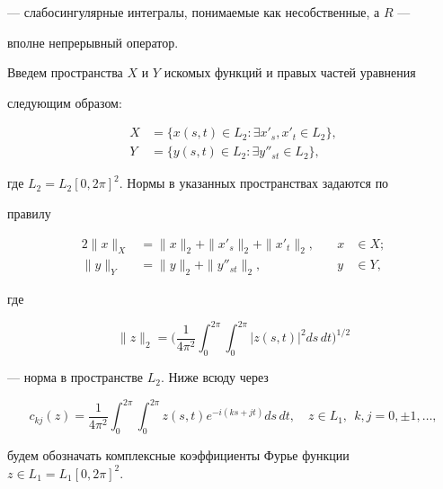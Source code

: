 --- слабосингулярные интегралы, понимаемые как несобственные, а $R$ --- 


вполне непрерывный оператор. 


 


Введем пространства $X$ и $Y$ искомых функций и правых частей уравнения  


следующим образом:  


\begin{align*} 


X&=\{x(s,t)\in L_2:\exists x'_s,x'_t\in L_2\},\\ 


Y&=\{y(s,t)\in L_2:\exists y''_{st}\in L_2\}, 


\end{align*} 


где $L_2=L_2[0,2\pi]^2$. Нормы в указанных пространствах задаются по 


правилу 


\begin{alignat*}{2} 


\|x\|_X&=\|x\|_2+\|x'_s\|_2+\|x'_t\|_2,&\quad x&\in X;\\ 


\|y\|_Y&=\|y\|_2+\|y''_{st}\|_2,&\quad y&\in Y, 


\end{alignat*} 


где 


$$ 


\|z\|_2=\bigg(\frac{1}{4\pi^2}\int^{2\pi}_0\int^{2\pi}_0 


|z(s,t)|^2ds\,dt\bigg)^{1/2} 


$$ 


--- норма в пространстве $L_2$. Ниже всюду через 


$$ 


c_{kj}(z)=\frac{1}{4\pi^2}\int^{2\pi}_0\int^{2\pi}_0 


z(s,t)e^{-i(ks+jt)}ds\,dt,\quad z\in L_1,\ \ k,j=0,\pm1,\dotsc, 


$$ 


будем обозначать комплексные коэффициенты Фурье функции $z\in 


L_1=L_1[0,2\pi]^2$. 


 


 


